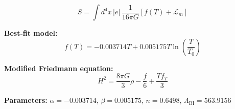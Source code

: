 
\begin{equation}
  S = \int d^4x \, |e| \, \frac{1}{16\pi G} \left[ f(T) + \mathcal{L}_m \right]
\end{equation}

\textbf{Best-fit model:}
\begin{equation}
  f(T) = -0.003714 T + 0.005175 T \ln\!\left(\frac{T}{T_0}\right)
\end{equation}

\textbf{Modified Friedmann equation:}
\begin{equation}
  H^2 = \frac{8\pi G}{3} \rho - \frac{f}{6} + \frac{T f_T}{3}
\end{equation}

\textbf{Parameters:}
$\alpha = -0.003714$, \quad
$\beta = 0.005175$, \quad
$n = 0.6498$, \quad
$\Lambda_{\text{BI}} = 563.9156$